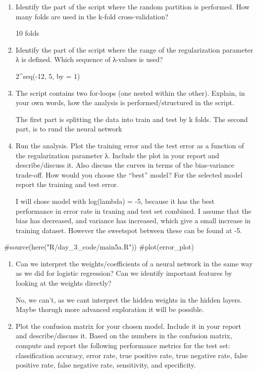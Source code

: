 \documentclass[
  letterpaper,
  DIV=11,
  numbers=noendperiod]{scrartcl}
\newenvironment{Shaded}{\begin{snugshade}}{\end{snugshade}}
\newcommand{\CommentTok}[1]{\textcolor[rgb]{0.37,0.37,0.37}{#1}}
\begin{document}
\begin{enumerate}
\def\labelenumi{(\alph{enumi})}
\setcounter{enumi}{3}
\item
  Identify the part of the script where the random partition is
  performed. How many folds are used in the k-fold cross-validation?

  10 folds
\item
  Identify the part of the script where the range of the regularization
  parameter λ is defined. Which sequence of λ-values is used?

  2\^{}seq(-12, 5, by = 1)
\item
  The script contains two for-loops (one nested within the other).
  Explain, in your own words, how the analysis is performed/structured
  in the script.

  The first part is splitting the data into train and test by k folds.
  The second part, is to rund the neural network
\item
  Run the analysis. Plot the training error and the test error as a
  function of the regularization parameter λ. Include the plot in your
  report and describe/discuss it. Also discuss the curves in terms of
  the bias-variance trade-off. How would you choose the ``best'' model?
  For the selected model report the training and test error.

  I will chose model with log(lambda) = -5, because it has the best
  performance in error rate in traning and test set combined. I assume
  that the bias has decreased, and variance has increased, which give a
  small increase in training dataset. However the sweetspot between
  these can be found at -5.
\end{enumerate}

\begin{Shaded}
\begin{Highlighting}[]
\CommentTok{\#source(here("R/day\_3\_code/main5a.R"))}
\CommentTok{\#plot(error\_plot)}
\end{Highlighting}
\end{Shaded}

\begin{enumerate}
\def\labelenumi{(\alph{enumi})}
\setcounter{enumi}{7}
\item
  Can we interpret the weights/coefficients of a neural network in the
  same way as we did for logistic regression? Can we identify important
  features by looking at the weights directly?

  No, we can't, as we cant interpret the hidden weights in the hidden
  layers. Maybe thorugh more advanced exploration it will be possible.
\item
  Plot the confusion matrix for your chosen model. Include it in your
  report and describe/discuss it. Based on the numbers in the confusion
  matrix, compute and report the following performance metrics for the
  test set: classification accuracy, error rate, true positive rate,
  true negative rate, false positive rate, false negative rate,
  sensitivity, and specificity.
\end{enumerate}
\end{document}
